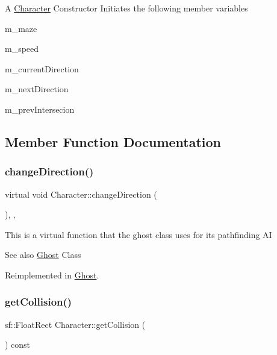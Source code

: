 A \hyperlink{class_character}{Character} Constructor Initiates the following member variables
\begin{DoxyItemize}
\item m\+\_\+maze
\item m\+\_\+speed
\item m\+\_\+current\+Direction
\item m\+\_\+next\+Direction
\item m\+\_\+prev\+Intersecion 
\end{DoxyItemize}

\subsection{Member Function Documentation}
\mbox{\label{class_character_ab4c0dc6f72c78607b921cf312e10ed35}} 
\subsubsection{\texorpdfstring{change\+Direction()}{changeDirection()}}
{\footnotesize\ttfamily virtual void Character\+::change\+Direction (\begin{DoxyParamCaption}{ }\end{DoxyParamCaption})\hspace{0.3cm}{\ttfamily [inline]}, {\ttfamily [protected]}, {\ttfamily [virtual]}}

This is a virtual function that the ghost class uses for it\textquotesingle{}s pathfinding AI

\begin{DoxySeeAlso}{See also}
\hyperlink{class_ghost}{Ghost} Class 
\end{DoxySeeAlso}


Reimplemented in \hyperlink{class_ghost_a08831fa01afa61f91365ce82cf33bf1b}{Ghost}.

\mbox{\label{class_character_ab267ab6083ac0b311fc86754ceaed269}} 
\subsubsection{\texorpdfstring{get\+Collision()}{getCollision()}}
{\footnotesize\ttfamily sf\+::\+Float\+Rect Character\+::get\+Collision (\begin{DoxyParamCaption}{ }\end{DoxyParamCaption}) const}

